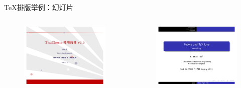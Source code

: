 \documentclass[xcolor=table,dvipsnames,svgnames]{beamer}
\begin{document}
\begin{frame}{\TeX{}排版举例：幻灯片}
  \begin{columns}
    \begin{column}{.45\textwidth}
      \begin{figure}[h]
        \centering
        \includegraphics[width=\textwidth]{slides-powerdot.pdf}
      \end{figure}
    \end{column}
    \begin{column}{.45\textwidth}
      \begin{figure}[h]
        \centering
        \includegraphics[width=\textwidth]{slides-beamer.pdf}
      \end{figure}
    \end{column}
  \end{columns}
\end{frame}
\end{document}
